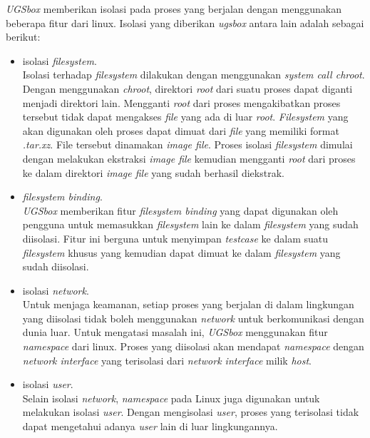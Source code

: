 \par \textit{UGSbox} memberikan isolasi pada proses yang berjalan dengan menggunakan beberapa fitur dari linux. Isolasi yang diberikan \textit{ugsbox} antara lain adalah sebagai berikut:
\begin{itemize}
    \item isolasi \textit{filesystem}. \\ Isolasi terhadap \textit{filesystem} dilakukan dengan menggunakan \textit{system call chroot}. Dengan menggunakan \textit{chroot}, direktori \textit{root} dari suatu  proses dapat diganti menjadi direktori lain. Mengganti \textit{root} dari proses mengakibatkan proses tersebut tidak dapat mengakses \textit{file} yang ada di luar \textit{root}. \textit{Filesystem} yang akan digunakan oleh proses dapat dimuat dari \textit{file} yang memiliki format \textit{.tar.xz}. File tersebut dinamakan \textit{image file}. Proses isolasi \textit{filesystem} dimulai dengan melakukan ekstraksi \textit{image file} kemudian mengganti \textit{root} dari proses ke dalam direktori \textit{image file} yang sudah berhasil diekstrak. 

    \item \textit{filesystem binding}. \\ \textit{UGSbox} memberikan fitur \textit{filesystem binding} yang dapat digunakan oleh pengguna untuk memasukkan \textit{filesystem} lain ke dalam \textit{filesystem} yang sudah diisolasi. Fitur ini berguna untuk menyimpan \textit{testcase} ke dalam suatu \textit{filesystem} khusus yang kemudian dapat dimuat ke dalam \textit{filesystem} yang sudah diisolasi.

    \item isolasi \textit{network}. \\ Untuk menjaga keamanan, setiap proses yang berjalan di dalam lingkungan yang diisolasi tidak boleh menggunakan \textit{network} untuk berkomunikasi dengan dunia luar. Untuk mengatasi masalah ini, \textit{UGSbox} menggunakan fitur \textit{namespace} dari linux. Proses yang diisolasi akan mendapat \textit{namespace} dengan \textit{network interface} yang terisolasi dari \textit{network interface} milik \textit{host}.

    \item isolasi \textit{user}. \\ Selain isolasi \textit{network}, \textit{namespace} pada Linux juga digunakan untuk melakukan isolasi \textit{user}. Dengan mengisolasi \textit{user}, proses yang terisolasi tidak dapat mengetahui adanya \textit{user} lain di luar lingkungannya.


\end{itemize}
